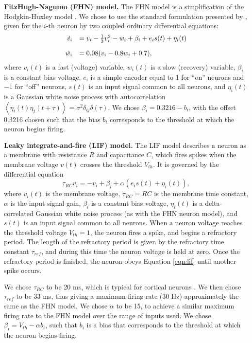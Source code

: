 \documentclass[12pt]{article}
\newcommand{\eqn}[1]{Equation \ref{eqn:#1}}
\newcommand{\eqnlabel}[1]{\label{eqn:#1}}
\begin{document}
\textbf{FitzHugh-Nagumo (FHN) model.} The FHN model is a simplification of the Hodgkin-Huxley model \citep{FitzHugh1961}. We chose to use the standard formulation presented by \cite{Izhikevich2006}, given for the $i$-th neuron by two coupled ordinary differential equations:
\begin{equation}
  \begin{array}{rl}
    \dot{v_i} & = v_i - \frac{1}{3}v_i^3 - w_i + \beta_i + e_i s(t) + \eta_i(t) \vspace{1em}\\
    \dot{w_i} & = 0.08(v_i - 0.8w_i + 0.7),
  \end{array}
  \eqnlabel{fhn}
\end{equation}
where $v_i(t)$ is a fast (voltage) variable, $w_i(t)$ is a slow (recovery) variable, $\beta_i$ is a constant bias voltage, $e_i$ is a simple encoder equal to 1 for ``on'' neurons and $-1$ for ``off'' neurons, $s(t)$ is an input signal common to all neurons, and $\eta_i(t)$ is a Gaussian white noise process with autocorrelation $\left<\eta_i(t)\eta_j(t + \tau)\right> = \sigma^2 \delta_{ij}\delta(\tau)$. We chose $\beta_i = 0.3216 - b_i$, with the offset 0.3216 chosen such that the bias $b_i$ corresponds to the threshold at which the neuron begins firing.

\textbf{Leaky integrate-and-fire (LIF) model.} The LIF model describes a neuron as a membrane with resistance $R$ and capacitance $C$, which fires spikes when the membrane voltage $v(t)$ crosses the threshold $V_{th}$. It is governed by the differential equation
\begin{equation}
  \tau_{RC} \dot{v_i} = -v_i + \beta_i + \alpha \left( e_i s(t) + \eta_i(t) \right),
  \eqnlabel{lif}
\end{equation}
where $v_i(t)$ is the membrane voltage, $\tau_{RC} = RC$ is the membrane time constant, $\alpha$ is the input signal gain, $\beta_i$ is a constant bias voltage, $\eta_i(t)$ is a delta-correlated Gaussian white noise process (as with the FHN neuron model), and $s(t)$ is an input signal common to all neurons. When a neuron voltage reaches the threshold voltage $V_{th} = 1$, the neuron fires a spike, and begins a refractory period. The length of the refractory period is given by the refractory time constant $\tau_{ref}$, and during this time the neuron voltage is held at zero. Once the refractory period is finished, the neuron obeys \eqn{lif} until another spike occurs.

We chose $\tau_{RC}$ to be 20 ms, which is typical for cortical neurons \citep{McCormick1985}. We then chose $\tau_{ref}$ to be 33 ms, thus giving a maximum firing rate (30 Hz) approximately the same as the FHN model. We chose $\alpha$ to be 15, to achieve a similar maximum firing rate to the FHN model over the range of inputs used. We chose $\beta_i = V_{th} - \alpha b_i$, such that $b_i$ is a bias that corresponds to the threshold at which the neuron begins firing.
\end{document}
